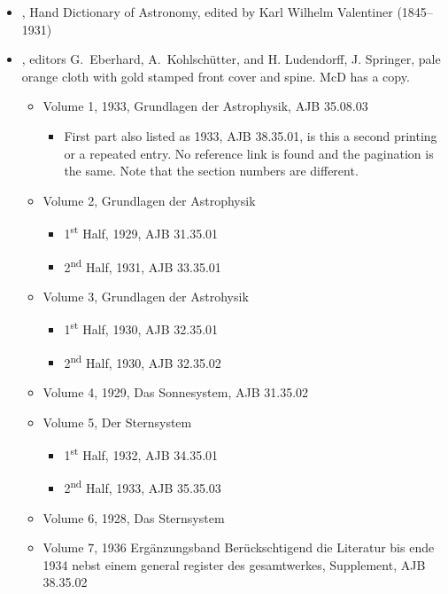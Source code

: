 \documentclass{article}
\begin{document}
\begin{itemize}
\item {}, Hand
  Dictionary of Astronomy, edited by Karl Wilhelm Valentiner
  (1845--1931)

\item {}, editors G.\ Eberhard,
  A.\ Kohlsch\"{u}tter, and H. Ludendorff, J. Springer, pale orange
  cloth with gold stamped front cover and spine. McD has a copy.
  \begin{itemize}
  \item Volume 1, 1933, Grundlagen der Astrophysik, AJB 35.08.03
    \begin{itemize}
    \item First part also listed as 1933, AJB 38.35.01, is this a
      second printing or a repeated entry.  No reference link is found
      and the pagination is the same. Note that the section numbers
      are different.
      \end{itemize}
  \item Volume 2, Grundlagen der Astrophysik
    \begin{itemize}
    \item 1\textsuperscript{st} Half, 1929, AJB 31.35.01
    \item 2\textsuperscript{nd} Half, 1931, AJB 33.35.01
    \end{itemize}
  \item Volume 3, Grundlagen der Astrohysik
    \begin{itemize}
    \item 1\textsuperscript{st} Half, 1930, AJB 32.35.01
    \item 2\textsuperscript{nd} Half, 1930, AJB 32.35.02
    \end{itemize}
  \item Volume 4, 1929,  Das Sonnesystem, AJB 31.35.02
  \item Volume 5, Der Sternsystem
    \begin{itemize}
    \item 1\textsuperscript{st} Half, 1932, AJB 34.35.01
    \item 2\textsuperscript{nd} Half, 1933, AJB 35.35.03
    \end{itemize}
  \item Volume 6, 1928, Das Sternsystem
  \item Volume 7, 1936 Erg\"{a}nzungsband Ber\"{u}ckschtigend die
    Literatur bis ende 1934 nebst einem general register des
    gesamtwerkes, Supplement, AJB 38.35.02
  \end{itemize}


\end{itemize}
\end{document}
